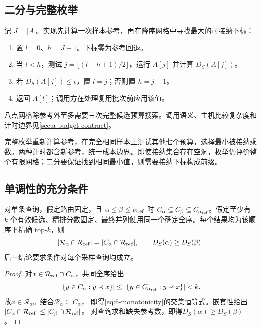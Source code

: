 \subsection{二分与完整枚举}

记 $J=|A|$。实现先计算一次样本参考，再在降序网格中寻找最大的可接纳下标：
\par\noindent\begin{minipage}{\linewidth}
\begin{enumerate}[leftmargin=*,itemsep=0.15em]
\item 置 $l=0$、$h=J-1$。下标零为参考回退。
\item 当 $l<h$，测试 $j=\lfloor(l+h+1)/2\rfloor$，运行 $A[j]$ 并计算 $D_S(A[j])$。
\item 若 $D_S(A[j])\leq\epsilon$，置 $l=j$；否则置 $h=j-1$。
\item 返回 $A[l]$；调用方在处理复用批次前应用该值。
\end{enumerate}
\end{minipage}\par\medskip
八点网格除参考外至多需要三次完整候选预算搜索。调用语义、主机比较复杂度和计时边界见\cref{sec:a-budget-contract}。

完整枚举重新计算参考，在完全相同样本上测试其他七个预算，选择最小被接纳乘数。两种计时都含新参考，统一成本边界。即使接纳集合存在空洞，枚举仍评价整个有限网格；二分要保证找到相同最小值，则需要接纳下标构成前缀。

\subsection{单调性的充分条件}

\par\noindent\begin{minipage}{\linewidth}
\begin{proposition}[嵌套候选保留参考成员]
\label{prop:6-monotonicity}
对单条查询，假定路由固定，且 $\alpha\leq\beta\leq\alpha_{\rm ref}$ 时
$C_\alpha\subseteq C_\beta\subseteq C_{\alpha_{\rm ref}}$。假定至少有 $k$ 个有效候选、精排分数固定、最终并列使用同一个确定全序。每个结果均为该顺序下精确 top-$k$，则
\begin{equation}
 |\mathcal R_\alpha\cap\mathcal R_{\rm ref}|
 =|C_\alpha\cap\mathcal R_{\rm ref}|,
 \qquad D_S(\alpha)\geq D_S(\beta).
 \label{eq:6-monotonicity}
\end{equation}
后一结论要求条件对每个采样查询均成立。
\end{proposition}
\begin{proof}
对$x\in\mathcal R_{\rm ref}\cap C_\alpha$，共同全序给出
\begin{equation*}
 |\{y\in C_\alpha:y\prec x\}|
 \leq|\{y\in C_{\alpha_{\rm ref}}:y\prec x\}|<k.
\end{equation*}
故$x\in\mathcal R_\alpha$。结合$\mathcal R_\alpha\subseteq C_\alpha$，
即得\cref{eq:6-monotonicity}的交集恒等式。嵌套性给出
$|C_\alpha\cap\mathcal R_{\rm ref}|
 \leq|C_\beta\cap\mathcal R_{\rm ref}|$。
对查询求和缺失参考数，即得$D_S(\alpha)\geq D_S(\beta)$。
\end{proof}
\end{minipage}\par\medskip

